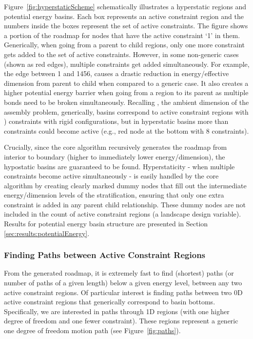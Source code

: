 \documentclass[]{article}
\newcommand{\figref}[1]{Figure~\ref{#1}}
\begin{document}
\figref{fig:hyperstaticScheme} 
schematically illustrates a hyperstatic regions and potential energy basins.
Each box represents an active constraint region and the numbers inside the
boxes represent the set of active constraints. The figure shows a portion of
the roadmap for nodes that have the active constraint `1' in them. Generically,
when going from a parent to child regions, only one more constraint gets added
to the set of active constraints.
However, in some
non-generic cases (shown as red edges), multiple constraints get added 
simultaneously. For example, the edge between 1 and
1456, causes a drastic reduction in energy/effective dimension from parent to
child when compared to a generic case. It also creates a higher potential
energy barrier when going from a region to its parent as multiple bonds need to
be broken simultaneously. Recalling , the ambient 
dimension of the assembly problem, generically, basins correspond to active constraint
regions with ) constraints with rigid configurations,
but in hyperstatic basins more than  constraints could become
active (e.g., red node at the bottom with 8 constraints).

Crucially, since the core algorithm recursively generates the roadmap from
interior to boundary (higher to immediately lower energy/dimension), the
hypostatic basins are guaranteed to be found.  Hyperstaticity - when multiple
constraints become active simultaneously - is easily handled by the core
algorithm by creating clearly marked dummy nodes that fill out the intermediate
energy/dimension levels of the stratification, ensuring that only one extra
constraint is added in any parent child relationship.  These dummy nodes are
not included in the count of active constraint regions (a landscape design
variable). Results for potential energy basin structure are presented in
Section \ref{sec:results:potentialEnergy}.

\subsubsection{Finding Paths between Active Constraint Regions}
\label{sec:methods:ConfPaths}
From the generated roadmap, it is extremely fast to find (shortest) paths (or
number of paths of a given length) below a given energy level, between any two
active constraint regions.  Of particular interest is finding paths between two
0D active constraint regions that generically correspond to basin bottoms.
Specifically, we are interested in paths through 1D regions (with one higher
degree of freedom and one fewer constraint). These regions represent a generic
one degree of freedom motion path (see \figref{fig:paths}). 
\end{document}
